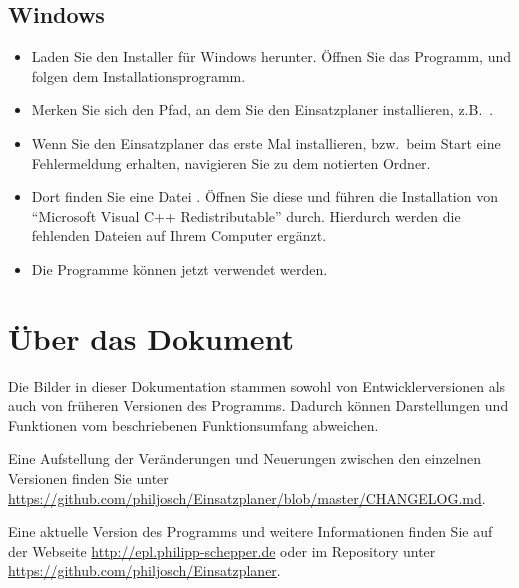 \subsection{Windows}
\begin{itemize}
  \item Laden Sie den Installer für Windows herunter.
  Öffnen Sie das Programm, und folgen dem Installationsprogramm.
  \item Merken Sie sich den Pfad, an dem Sie den Einsatzplaner installieren, z.B.\ .
  \item Wenn Sie den Einsatzplaner das erste Mal installieren,
  bzw.\ beim Start eine Fehlermeldung erhalten,
  navigieren Sie zu dem notierten Ordner.
  \item Dort finden Sie eine Datei .
  Öffnen Sie diese und führen die Installation von \enquote{Microsoft Visual C++ Redistributable} durch.
  Hierdurch werden die fehlenden Dateien auf Ihrem Computer ergänzt.
  \item Die Programme können jetzt verwendet werden.
\end{itemize}



\section{Über das Dokument}\label{epl:allg:sonstiges}
Die Bilder in dieser Dokumentation stammen sowohl von Entwicklerversionen als auch von früheren Versionen des Programms.
Dadurch können Darstellungen und Funktionen
vom beschriebenen Funktionsumfang abweichen.

Eine Aufstellung der Veränderungen und Neuerungen
zwischen den einzelnen Versionen finden Sie unter
 \url{https://github.com/philjosch/Einsatzplaner/blob/master/CHANGELOG.md}.

Eine aktuelle Version des Programms und weitere Informationen
finden Sie auf der Webseite \url{http://epl.philipp-schepper.de}
oder im Repository unter \url{https://github.com/philjosch/Einsatzplaner}.
